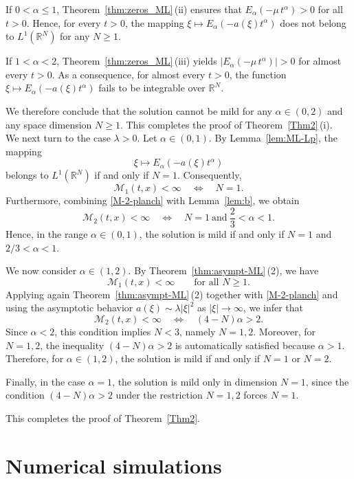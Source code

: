 \documentclass[12pt, reqno]{amsart}
\begin{document}
If $0<\alpha\le 1$, Theorem~\ref{thm:zeros_ML}\,(ii) ensures that
$E_{\alpha}(-\mu\,t^{\alpha})>0$ for all $t>0$. Hence, for every $t>0$, the mapping
$\xi\mapsto E_{\alpha}(-a(\xi)t^{\alpha})$ does not belong to $L^{1}(\mathbb{R}^{N})$
for any $N\ge1$.

If $1<\alpha<2$, Theorem~\ref{thm:zeros_ML}\,(iii) yields
$\bigl|E_{\alpha}(-\mu\,t^{\alpha})\bigr|>0$ for almost every $t>0$. As a consequence,
for almost every $t>0$, the function
$\xi\mapsto E_{\alpha}(-a(\xi)t^{\alpha})$ fails to be integrable over $\mathbb{R}^{N}$.

We therefore conclude that the solution cannot be mild for any $\alpha\in(0,2)$ and
any space dimension $N\ge1$. This completes the proof of
Theorem~\ref{Thm2}\,(i).\\
We next turn to the case $\lambda>0$.  
Let $\alpha\in(0,1)$. By Lemma~\ref{lem:ML-Lp}, the mapping
\[
\xi \longmapsto E_{\alpha}\!\left(-a(\xi)t^{\alpha}\right)
\]
belongs to $L^{1}(\mathbb{R}^{N})$ if and only if $N=1$. Consequently,
\[
\mathcal{M}_{1}(t,x)<\infty \quad \Longleftrightarrow \quad N=1.
\]
Furthermore, combining \eqref{M-2-planch} with Lemma~\ref{lem:b}, we obtain
\[
\mathcal{M}_{2}(t,x)<\infty 
\quad \Longleftrightarrow \quad N=1 \ \text{and}\ \frac{2}{3}<\alpha<1.
\]
Hence, in the range $\alpha\in(0,1)$, the solution is mild if and only if
$N=1$ and $2/3<\alpha<1$.

We now consider $\alpha\in(1,2)$. By Theorem~\ref{thm:asympt-ML}\,(2), we have
\[
\mathcal{M}_{1}(t,x)<\infty \qquad \text{for all } N\ge1.
\]
Applying again Theorem~\ref{thm:asympt-ML}\,(2) together with
\eqref{M-2-planch} and using the asymptotic behavior
$a(\xi)\sim \lambda|\xi|^{2}$ as $|\xi|\to\infty$, we infer that
\[
\mathcal{M}_{2}(t,x)<\infty 
\quad \Longleftrightarrow \quad (4-N)\alpha>2.
\]
Since $\alpha<2$, this condition implies $N<3$, namely $N=1,2$.
Moreover, for $N=1,2$, the inequality $(4-N)\alpha>2$ is automatically
satisfied because $\alpha>1$. Therefore, for $\alpha\in(1,2)$, the
solution is mild if and only if $N=1$ or $N=2$.

Finally, in the  case $\alpha=1$, the solution is mild only in
dimension $N=1$, since the condition $(4-N)\alpha>2$ under the restriction
$N=1,2$ forces $N=1$.

This completes the proof of Theorem~\ref{Thm2}.


\section{Numerical simulations}
\label{sec:num}
\end{document}

